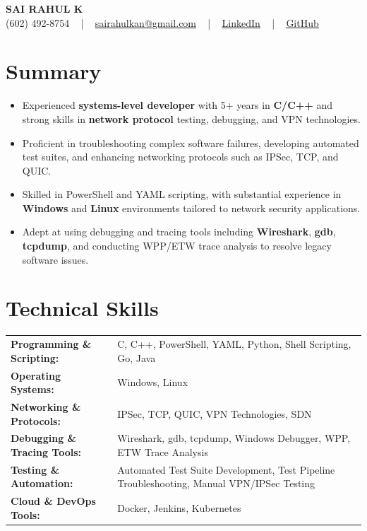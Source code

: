 \documentclass[letterpaper,11pt]{article}
\newcommand{\resumeItem}[1]{
  \item\footnotesize{
    {#1 \vspace{-2pt}}
  }
}
\newcommand{\resumeItemListStart}{\begin{itemize}[leftmargin=*]}
\newcommand{\resumeItemListEnd}{\end{itemize}\vspace{-5pt}}
\begin{document}
\begin{center}
    {\fontsize{14pt}{12pt}\selectfont \textbf{\MakeUppercase{Sai Rahul K}}}\\ \vspace{2pt}
    \fontsize{10pt}{12pt}\selectfont (602) 492-8754 ~ | ~ \href{mailto:sairahulkan@gmail.com}{sairahulkan@gmail.com} ~ | ~
    \href{https://www.linkedin.com/in/rq123/}{\color{blue}\underline{LinkedIn}} ~ | ~
    \href{https://github.com/kanrahuldo}{\color{blue}\underline{GitHub}}~
    \vspace{-8pt}
\end{center}

\section{Summary}
\fontsize{9pt}{10pt}\selectfont
\resumeItemListStart
    \resumeItem{Experienced \textbf{systems-level developer} with 5+ years in \textbf{C/C++} and strong skills in \textbf{network protocol} testing, debugging, and VPN technologies.}
    \resumeItem{Proficient in troubleshooting complex software failures, developing automated test suites, and enhancing networking protocols such as IPSec, TCP, and QUIC.}
    \resumeItem{Skilled in PowerShell and YAML scripting, with substantial experience in \textbf{Windows} and \textbf{Linux} environments tailored to network security applications.}
    \resumeItem{Adept at using debugging and tracing tools including \textbf{Wireshark}, \textbf{gdb}, \textbf{tcpdump}, and conducting WPP/ETW trace analysis to resolve legacy software issues.}
\resumeItemListEnd
\vspace{-6pt}

\section{Technical Skills}
        \vspace{-14pt}
        \begin{table}[h]
            \fontsize{9pt}{10pt}\selectfont
            \begin{tabular}{p{0.3\linewidth} p{0.7\linewidth}}
                \textbf{Programming \& Scripting:} & C, C++, PowerShell, YAML, Python, Shell Scripting, Go, Java \\
                \textbf{Operating Systems:} & Windows, Linux \\
                \textbf{Networking \& Protocols:} & IPSec, TCP, QUIC, VPN Technologies, SDN \\
                \textbf{Debugging \& Tracing Tools:} & Wireshark, gdb, tcpdump, Windows Debugger, WPP, ETW Trace Analysis \\
                \textbf{Testing \& Automation:} & Automated Test Suite Development, Test Pipeline Troubleshooting, Manual VPN/IPSec Testing \\
                \textbf{Cloud \& DevOps Tools:} & Docker, Jenkins, Kubernetes \\
            \end{tabular}
        \end{table}
    \vspace{-15pt}
\end{document}

